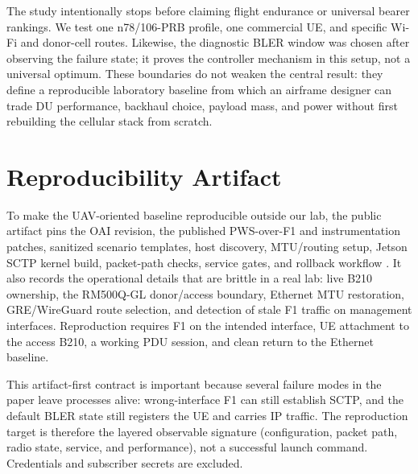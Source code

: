 \documentclass[conference]{IEEEtran}
\begin{document}
The study intentionally stops before claiming flight endurance or universal
bearer rankings. We test one n78/106-PRB profile, one commercial UE, and
specific Wi-Fi and donor-cell routes. Likewise, the diagnostic BLER window was
chosen after observing the failure state; it proves the controller mechanism
in this setup, not a universal optimum. These boundaries do not weaken the
central result: they define a reproducible laboratory baseline from which an
airframe designer can trade DU performance, backhaul choice, payload mass, and
power without first rebuilding the cellular stack from scratch.

\section{Reproducibility Artifact}
To make the UAV-oriented baseline reproducible outside our lab, the public
artifact pins the OAI revision, the published PWS-over-F1 and instrumentation
patches, sanitized scenario templates, host discovery, MTU/routing setup,
Jetson SCTP kernel build, packet-path checks, service gates, and rollback
workflow \cite{artifactrepo,pwspatch,jetsonkernelrepo}. It also records the operational details
that are brittle in a real lab: live B210 ownership, the RM500Q-GL donor/access
boundary, Ethernet MTU restoration, GRE/WireGuard route selection, and
detection of stale F1 traffic on management interfaces. Reproduction requires
F1 on the intended interface, UE attachment to the access B210, a working PDU
session, and clean return to the Ethernet baseline.

This artifact-first contract is important because several failure modes in the
paper leave processes alive: wrong-interface F1 can still establish SCTP, and
the default BLER state still registers the UE and carries IP traffic. The
reproduction target is therefore the layered observable signature
(configuration, packet path, radio state, service, and performance), not a
successful launch command. Credentials and subscriber secrets are excluded.
\end{document}
